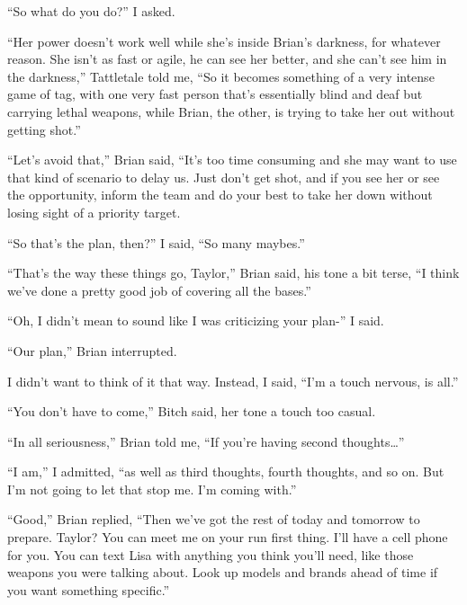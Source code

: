 ``So what do you do?'' I asked.



``Her power doesn't work well while she's inside Brian's darkness, for whatever reason.  She isn't as fast or agile, he can see her better, and she can't see him in the darkness,'' Tattletale told me, ``So it becomes something of a very intense game of tag, with one very fast person that's essentially blind and deaf but carrying lethal weapons, while Brian, the other, is trying to take her out without getting shot.''



``Let's avoid that,'' Brian said, ``It's too time consuming and she may want to use that kind of scenario to delay us.  Just don't get shot, and if you see her or see the opportunity, inform the team and do your best to take her down without losing sight of a priority target.



``So that's the plan, then?'' I said, ``So many maybes.''



``That's the way these things go, Taylor,'' Brian said, his tone a bit terse, ``I think we've done a pretty good job of covering all the bases.''



``Oh, I didn't mean to sound like I was criticizing your plan-'' I said.



``Our plan,'' Brian interrupted.



I didn't want to think of it that way.  Instead, I said, ``I'm a touch nervous, is all.''



``You don't have to come,'' Bitch said, her tone a touch too casual.



``In all seriousness,'' Brian told me, ``If you're having second thoughts\ldots''



``I am,'' I admitted, ``as well as third thoughts, fourth thoughts, and so on.  But I'm not going to let that stop me.  I'm coming with.''



``Good,'' Brian replied, ``Then we've got the rest of today and tomorrow to prepare.  Taylor?  You can meet me on your run first thing.  I'll have a cell phone for you.  You can text Lisa with anything you think you'll need, like those weapons you were talking about.  Look up models and brands ahead of time if you want something specific.''



